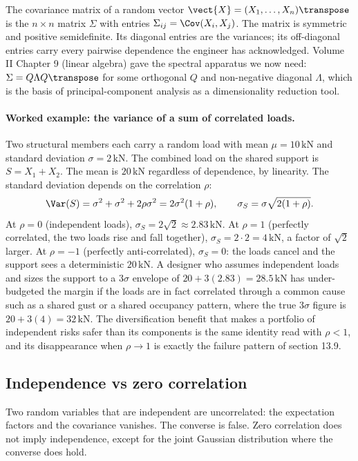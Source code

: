 The covariance matrix of a random vector $\vect{X} = (X_{1}, \ldots,
X_{n})\transpose$ is the $n \times n$ matrix $\Sigma$ with entries
$\Sigma_{ij} = \Cov(X_{i}, X_{j})$. The matrix is symmetric and
positive semidefinite. Its diagonal entries are the variances; its
off-diagonal entries carry every pairwise dependence the engineer
has acknowledged. Volume II Chapter 9 (linear algebra) gave the
spectral apparatus we now need: $\Sigma = Q \Lambda Q\transpose$ for
some orthogonal $Q$ and non-negative diagonal $\Lambda$, which is
the basis of principal-component analysis as a dimensionality
reduction tool.

\paragraph{Worked example: the variance of a sum of correlated
loads.} Two structural members each carry a random load with mean
$\mu = 10\,\text{kN}$ and standard deviation $\sigma = 2\,\text{kN}$.
The combined load on the shared support is $S = X_{1} + X_{2}$. The
mean is $20\,\text{kN}$ regardless of dependence, by linearity. The
standard deviation depends on the correlation $\rho$:
\[
\Var(S) = \sigma^{2} + \sigma^{2} + 2\rho \sigma^{2}
= 2\sigma^{2}(1 + \rho),
\qquad \sigma_{S} = \sigma\sqrt{2(1 + \rho)}.
\]
At $\rho = 0$ (independent loads), $\sigma_{S} = 2\sqrt{2} \approx
2.83\,\text{kN}$. At $\rho = 1$ (perfectly correlated, the two loads
rise and fall together), $\sigma_{S} = 2 \cdot 2 = 4\,\text{kN}$, a
factor of $\sqrt{2}$ larger. At $\rho = -1$ (perfectly
anti-correlated), $\sigma_{S} = 0$: the loads cancel and the support
sees a deterministic $20\,\text{kN}$. A designer who assumes
independent loads and sizes the support to a $3\sigma$ envelope of
$20 + 3(2.83) = 28.5\,\text{kN}$ has under-budgeted the margin if the
loads are in fact correlated through a common cause such as a shared
gust or a shared occupancy pattern, where the true $3\sigma$ figure
is $20 + 3(4) = 32\,\text{kN}$. The diversification benefit that
makes a portfolio of independent risks safer than its components is
the same identity read with $\rho < 1$, and its disappearance when
$\rho \to 1$ is exactly the failure pattern of section 13.9.

\subsection{Independence vs zero correlation}

Two random variables that are independent are uncorrelated: the
expectation factors and the covariance vanishes. The converse is
false. Zero correlation does not imply independence, except for the
joint Gaussian distribution where the converse does hold.

